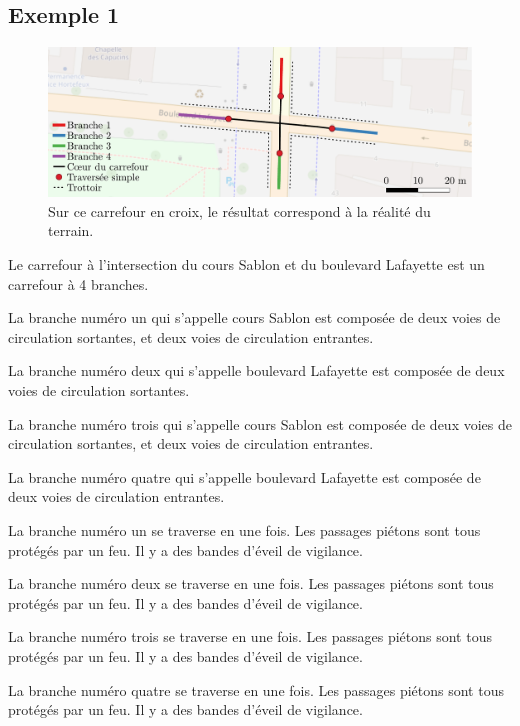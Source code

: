 \begin{appendix}
\newpage
\section*{Exemple 1}

\begin{figure}[ht]
  \centering
  \includegraphics[width=\textwidth]{images/annexes/carrefour_simple.pdf}
  \caption{Sur ce carrefour en croix, le résultat correspond à la réalité du terrain.}
  \label{fig:exemple1}
\end{figure}

Le carrefour à l'intersection du cours Sablon et du boulevard Lafayette est un carrefour à 4 branches.

\newpar{}

La branche numéro un qui s'appelle cours Sablon est composée de deux voies de circulation sortantes, et deux voies de circulation entrantes.

La branche numéro deux qui s'appelle boulevard Lafayette est composée de deux voies de circulation sortantes.

La branche numéro trois qui s'appelle cours Sablon est composée de deux voies de circulation sortantes, et deux voies de circulation entrantes.

La branche numéro quatre qui s'appelle boulevard Lafayette est composée de deux voies de circulation entrantes.

\newpar{}

La branche numéro un se traverse en une fois. Les passages piétons sont tous protégés par un feu. Il y a des bandes d'éveil de vigilance.

La branche numéro deux se traverse en une fois. Les passages piétons sont tous protégés par un feu. Il y a des bandes d'éveil de vigilance.

La branche numéro trois se traverse en une fois. Les passages piétons sont tous protégés par un feu. Il y a des bandes d'éveil de vigilance.

La branche numéro quatre se traverse en une fois. Les passages piétons sont tous protégés par un feu. Il y a des bandes d'éveil de vigilance.


\end{appendix}
